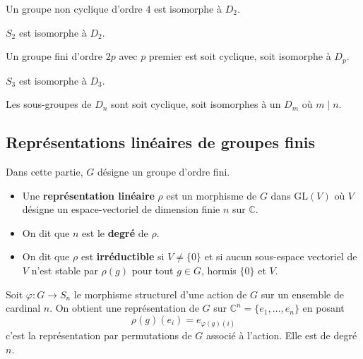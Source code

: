 	
	\begin{proposition}
		Un groupe non cyclique d'ordre $4$ est isomorphe à $D_2$.
	\end{proposition}
	
	
	\begin{example}
		$S_2$ est isomorphe à $D_2$.
	\end{example}
	
	
	\begin{proposition}
		Un groupe fini d'ordre $2p$ avec $p$ premier est soit cyclique, soit isomorphe à $D_p$.
	\end{proposition}
	
	\begin{example}
		$S_3$ est isomorphe à $D_3$.
	\end{example}
	
	
	\begin{proposition}
		Les sous-groupes de $D_n$ sont soit cyclique, soit isomorphes à un $D_m$ où $m \mid n$.
	\end{proposition}
	
	\subsection{Représentations linéaires de groupes finis}
	
	
	Dans cette partie, $G$ désigne un groupe d'ordre fini.
	
	\begin{definition}
		\begin{itemize}
			\item Une \textbf{représentation linéaire} $\rho$ est un morphisme de $G$ dans $\mathrm{GL}(V)$ où $V$ désigne un espace-vectoriel de dimension finie $n$ sur $\mathbb{C}$.
			\item On dit que $n$ est le \textbf{degré} de $\rho$.
			\item On dit que $\rho$ est \textbf{irréductible} si $V \neq \{ 0 \}$ et si aucun sous-espace vectoriel de $V$ n'est stable par $\rho(g)$ pour tout $g \in G$, hormis $\{ 0 \}$ et $V$.
		\end{itemize}
	\end{definition}
	
	\begin{example}
		Soit $\varphi : G \rightarrow S_n$ le morphisme structurel d'une action de $G$ sur un ensemble de cardinal $n$. On obtient une représentation de $G$ sur $\mathbb{C}^n = \{ e_1, \dots, e_n \}$ en posant
		\[ \rho(g)(e_i) = e_{\varphi(g)(i)} \]
		c'est la représentation par permutations de $G$ associé à l'action. Elle est de degré $n$.
	\end{example}
	
